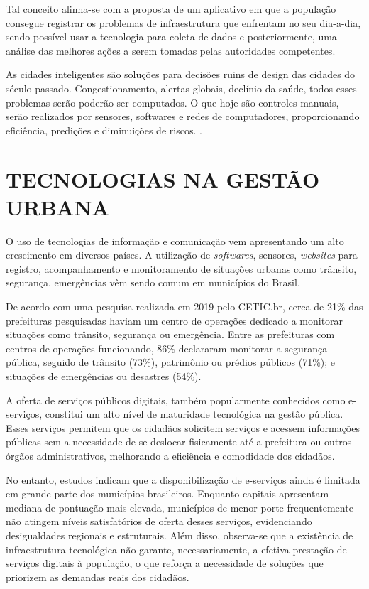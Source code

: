Tal conceito alinha-se com a proposta de um aplicativo em que a população consegue registrar os problemas de infraestrutura que enfrentam no seu dia-a-dia, sendo possível usar a tecnologia para coleta de dados e posteriormente, uma análise das melhores ações a serem tomadas pelas autoridades competentes.

As cidades inteligentes são soluções para decisões ruins de design das cidades do século passado. Congestionamento, alertas globais, declínio da saúde, todos esses problemas serão poderão ser computados. O que hoje são controles manuais, serão realizados por sensores, softwares e redes de computadores, proporcionando eficiência, predições e diminuições de riscos. \cite{townsend_smartcities}.

\section{TECNOLOGIAS NA GESTÃO URBANA}
O uso de tecnologias de informação e comunicação vem apresentando um alto crescimento em diversos países. A utilização de \textit{softwares}, sensores, \textit{websites} para registro, acompanhamento e monitoramento de situações urbanas como trânsito, segurança, emergências vêm sendo comum em municípios do Brasil. 

De acordo com uma pesquisa realizada em 2019 pelo CETIC.br, cerca de 21\% das prefeituras pesquisadas haviam um centro de operações dedicado a monitorar situações como trânsito, segurança ou emergência\cite{nicbr_cidades_inteligentes_2020}. Entre as prefeituras com centros de operações funcionando, 86\% declararam monitorar a segurança pública, seguido de trânsito (73\%), patrimônio ou prédios públicos (71\%); e situações de emergências ou desastres (54\%). 

A oferta de serviços públicos digitais, também popularmente conhecidos como e-serviços, constitui um alto nível de maturidade tecnológica na gestão pública. Esses serviços permitem que os cidadãos solicitem serviços e acessem informações públicas sem a necessidade de se deslocar fisicamente até a prefeitura ou outros órgãos administrativos, melhorando a eficiência e comodidade dos cidadãos.

No entanto, estudos indicam que a disponibilização de e-serviços ainda é limitada em grande parte dos municípios brasileiros. Enquanto capitais apresentam mediana de pontuação mais elevada, municípios de menor porte frequentemente não atingem níveis satisfatórios de oferta desses serviços, evidenciando desigualdades regionais e estruturais\cite{nicbr_cidades_inteligentes_2020}. Além disso, observa-se que a existência de infraestrutura tecnológica não garante, necessariamente, a efetiva prestação de serviços digitais à população, o que reforça a necessidade de soluções que priorizem as demandas reais dos cidadãos.


